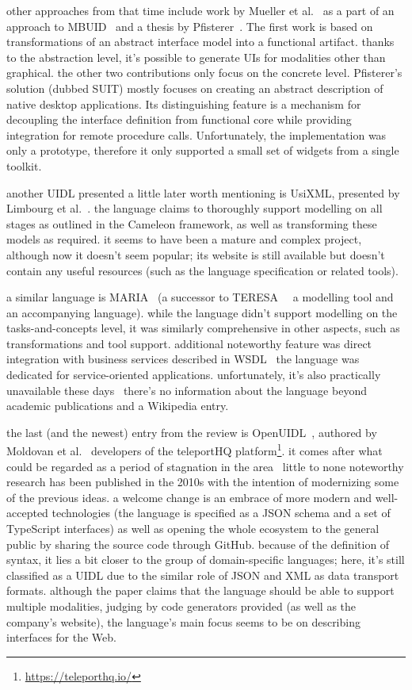 other approaches from that time include work by Mueller et al.~\cite{Mueller2001-un} as a part of an approach to MBUID~\cite{elwert1995Modelling} and a thesis by Pfisterer~\cite{pfistererSemantic2002}.
The first work is based on transformations of an abstract interface model into a functional artifact.
thanks to the abstraction level, it's possible to generate UIs for modalities other than graphical.
the other two contributions only focus on the concrete level.
Pfisterer's solution (dubbed SUIT) mostly focuses on creating an abstract description of native desktop applications.
Its distinguishing feature is a mechanism for decoupling the interface definition from functional core while providing integration for remote procedure calls.
Unfortunately, the implementation was only a prototype, therefore it only supported a small set of widgets from a single toolkit.

another UIDL presented a little later worth mentioning is UsiXML, presented by Limbourg et al.~\cite{limbourg2004usixml,limbourgusixml}.
the language claims to thoroughly support modelling on all stages as outlined in the Cameleon framework, as well as transforming these models as required.
it seems to have been a mature and complex project, although now it doesn't seem popular;
its website is still available but doesn't contain any useful resources (such as the language specification or related tools).

a similar language is MARIA~\cite{Paterno2009-nj} (a successor to TERESA~\cite{Mori2004-sr} \textemdash\ a modelling tool and an accompanying language).
while the language didn't support modelling on the tasks-and-concepts level, it was similarly comprehensive in other aspects, such as transformations and tool support.
additional noteworthy feature was direct integration with business services described in WSDL \textemdash\ the language was dedicated for service-oriented applications.
unfortunately, it's also practically unavailable these days \textemdash\ there's no information about the language beyond academic publications and a Wikipedia entry.

the last (and the newest) entry from the review is OpenUIDL~\cite{moldovan2020open}, authored by Moldovan et al. \textemdash\ developers of the teleportHQ platform\footnote{\url{https://teleporthq.io/}}.
it comes after what could be regarded as a period of stagnation in the area \textemdash\ little to none noteworthy research has been published in the 2010s with the intention of modernizing some of the previous ideas.
a welcome change is an embrace of more modern and well-accepted technologies (the language is specified as a JSON schema and a set of TypeScript interfaces) as well as opening the whole ecosystem to the general public by sharing the source code through GitHub.
because of the definition of syntax, it lies a bit closer to the group of domain-specific languages;
here, it's still classified as a UIDL due to the similar role of JSON and XML as data transport formats.
although the paper claims that the language should be able to support multiple modalities, judging by code generators provided (as well as the company's website), the language's main focus seems to be on describing interfaces for the Web.

